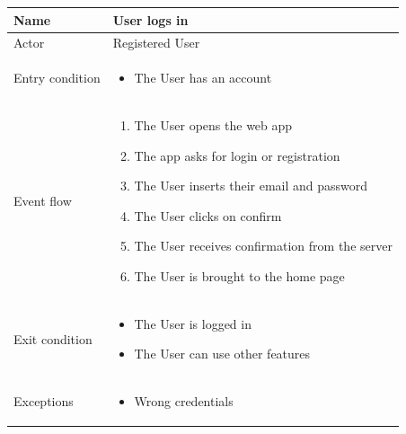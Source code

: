 \begin{table}[H]
    \begin{tabu} to \textwidth {|X|X[4]|}
        \hline
        Name            & User logs in               \\ \hline
        Actor           & Registered User            \\ \hline
        Entry condition & \begin{itemize}
            \item The User has an account
        \end{itemize}  \\ \hline
        Event flow      & \begin{enumerate}
            \item The User opens the web app
            \item The app asks for login or registration
            \item The User inserts their email and password
            \item The User clicks on confirm
            \item The User receives confirmation from the server
            \item The User is brought to the home page
        \end{enumerate} \\ \hline
        Exit condition  & \begin{itemize}
            \item The User is logged in
            \item The User can use other features
        \end{itemize} \\ \hline
        Exceptions      & \begin{itemize}
            \item Wrong credentials
        \end{itemize} \\ \hline
    \end{tabu}
\end{table}

